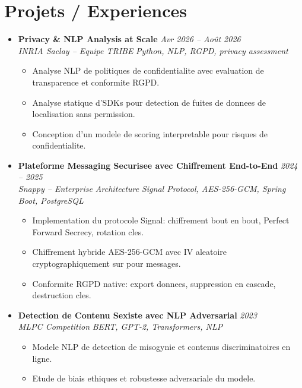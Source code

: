\documentclass[a4paper,11pt]{article}
\begin{document}
\section{Projets / Experiences}
\begin{itemize}[leftmargin=*, label={-}]

\item \textbf{Privacy \& NLP Analysis at Scale} \hfill \textit{Avr 2026 -- Ao\^ut 2026} \\
\textit{INRIA Saclay -- Equipe TRIBE} \hfill \textit{Python, NLP, RGPD, privacy assessment}
\vspace{-2pt}
    \begin{itemize}[leftmargin=0.4cm, nosep, label=\tiny$\bullet$]
        \item \small{Analyse NLP de politiques de confidentialite avec evaluation de transparence et conformite RGPD.}
        \item \small{Analyse statique d'SDKs pour detection de fuites de donnees de localisation sans permission.}
        \item \small{Conception d'un modele de scoring interpretable pour risques de confidentialite.}
    \end{itemize}
\vspace{3pt}

\item \textbf{Plateforme Messaging Securisee avec Chiffrement End-to-End} \hfill \textit{2024 -- 2025} \\
\textit{Snappy -- Enterprise Architecture} \hfill \textit{Signal Protocol, AES-256-GCM, Spring Boot, PostgreSQL}
\vspace{-2pt}
    \begin{itemize}[leftmargin=0.4cm, nosep, label=\tiny$\bullet$]
        \item \small{Implementation du protocole Signal: chiffrement bout en bout, Perfect Forward Secrecy, rotation cles.}
        \item \small{Chiffrement hybride AES-256-GCM avec IV aleatoire cryptographiquement sur pour messages.}
        \item \small{Conformite RGPD native: export donnees, suppression en cascade, destruction cles.}
    \end{itemize}
\vspace{3pt}

\item \textbf{Detection de Contenu Sexiste avec NLP Adversarial} \hfill \textit{2023} \\
\textit{MLPC Competition} \hfill \textit{BERT, GPT-2, Transformers, NLP}
\vspace{-2pt}
    \begin{itemize}[leftmargin=0.4cm, nosep, label=\tiny$\bullet$]
        \item \small{Modele NLP de detection de misogynie et contenus discriminatoires en ligne.}
        \item \small{Etude de biais ethiques et robustesse adversariale du modele.}
    \end{itemize}
\vspace{3pt}


\end{itemize}
\end{document}
